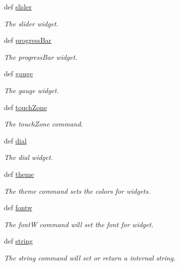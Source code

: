 \begin{DoxyCompactItemize}
def \hyperlink{group___widgets_ga93ee96540f5ffc5c4704f60592074d80}{slider}
\begin{DoxyCompactList}\small\item\em The slider widget. \end{DoxyCompactList}\item 
def \hyperlink{group___widgets_ga9eeb62ec0060e5ba57e42986b2d555ae}{progress\-Bar}
\begin{DoxyCompactList}\small\item\em The progress\-Bar widget. \end{DoxyCompactList}\item 
def \hyperlink{group___widgets_gab71489d4d59dfc595166ed91ff97ed3b}{gauge}
\begin{DoxyCompactList}\small\item\em The gauge widget. \end{DoxyCompactList}\item 
def \hyperlink{group___widgets_gaeb901f189e33956b4cd51fbd78bcf957}{touch\-Zone}
\begin{DoxyCompactList}\small\item\em The touch\-Zone command. \end{DoxyCompactList}\item 
def \hyperlink{group___widgets_ga0122f7d8c41bb07221be8a778ca8fd53}{dial}
\begin{DoxyCompactList}\small\item\em The dial widget. \end{DoxyCompactList}\item 
def \hyperlink{group___widgets_ga334488d30595cf0dd9e2742c65558e2c}{theme}
\begin{DoxyCompactList}\small\item\em The theme command sets the colors for widgets. \end{DoxyCompactList}\item 
def \hyperlink{group___widgets_ga0efc2d431900e2b77a30e19bb556fb3a}{fontw}
\begin{DoxyCompactList}\small\item\em The font\-W command will set the font for widget. \end{DoxyCompactList}\item 
def \hyperlink{group___widgets_gae2b2686b92f93d6fc84de7a19518a89f}{string}
\begin{DoxyCompactList}\small\item\em The string command will set or return a internal string. \end{DoxyCompactList}\item 

\end{DoxyCompactItemize}
